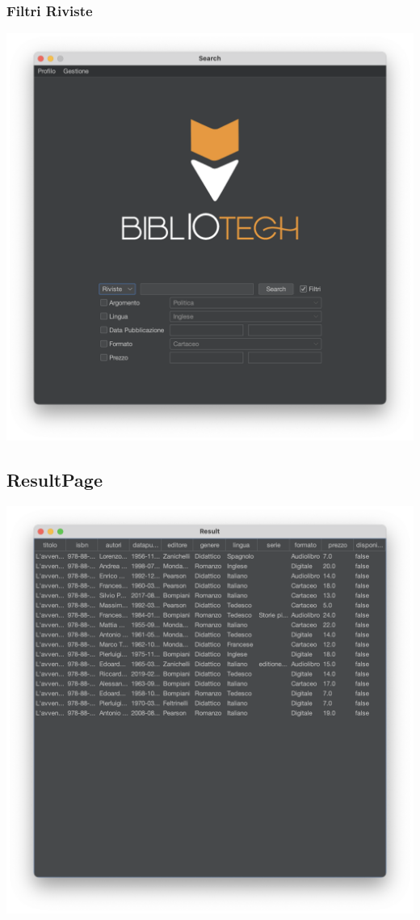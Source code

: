 \subsubsection{Filtri Riviste}
\includegraphics[scale=0.25, center]{Immagini/Schermate/Search/SearchPage-FiltriRiviste.png}

\subsection{ResultPage}
\includegraphics[scale=0.25, center]{Immagini/Schermate/Search/ResultPage.png}

